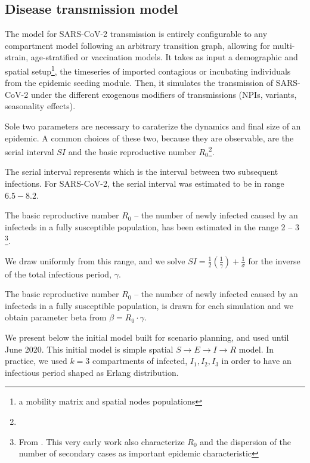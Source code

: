 \subsection{Disease transmission model}
The model for SARS-CoV-2 transmission is entirely configurable to any compartment model following an arbitrary transition graph, allowing for multi-strain, age-stratified or vaccination models. It takes as input a demographic and spatial setup\footnote{\ie a mobility matrix and spatial nodes populations}, the timeseries of imported contagious or incubating individuals from the epidemic seeding module. Then, it simulates the transmission of SARS-CoV-2 under the different exogenous modifiers of transmissions (NPIs, variants, seasonality effects). 

Sole two parameters are necessary to caraterize the dynamics and final size of an epidemic. A common choices of these two, because they are observable, are the serial interval $SI$ and the basic reproductive number $R_0$\footnote{}.

The serial interval represents which is the interval between two subsequent infections. For SARS-CoV-2, the serial interval was estimated to be in range $6.5-8.2$\cite[][Table S4]{Bi:EpidemiologyTransmissionCOVID19:2020}. 

The basic reproductive number $R_0$ -- the number of newly infected caused by an infecteds in a fully susceptible population, has been estimated in the range 2 -- 3 \footnote{From . This very early work also characterize $R_0$ and the dispersion of the number of secondary cases as important epidemic characteristic}.



We draw uniformly from this range, and we solve
$SI = \frac{1}{2}(\frac{1}{\gamma})+\frac{1}{\sigma}$ for the inverse of the total infectious period, $\gamma$.

The basic reproductive number $R_0$ -- the number of newly infected caused by an infecteds in a fully susceptible population, is drawn for each simulation and we obtain parameter beta from
$\beta= R_0 \cdot \gamma$.

We present below the initial model built for scenario planning, and used until June 2020. This initial model is simple spatial $S\longrightarrow E \longrightarrow I \longrightarrow R$ model. In practice, we used $k = 3$ compartments of infected, $I_1, I_2, I_3$ in order to have an infectious period shaped as Erlang distribution.



